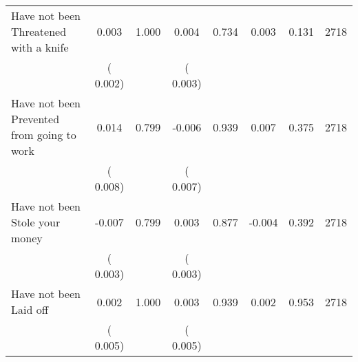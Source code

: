 \begin{tabular}{l*{7}{c}}
 Have not been Threatened with a knife       &              0.003       &        1.000  &              0.004       &        0.734  &              0.003       &              0.131 &  2718 \\ 
                       &       (       0.002)             &                               &       (       0.003)                     &                               &                                               &                                &                      \\ 

 Have not been Prevented from going to work       &              0.014       &        0.799  &             -0.006       &        0.939  &              0.007       &              0.375 &  2718 \\ 
                       &       (       0.008)             &                               &       (       0.007)                     &                               &                                               &                                &                      \\ 

 Have not been Stole your money       &             -0.007       &        0.799  &              0.003       &        0.877  &             -0.004       &              0.392 &  2718 \\ 
                       &       (       0.003)             &                               &       (       0.003)                     &                               &                                               &                                &                      \\ 

 Have not been Laid off       &              0.002       &        1.000  &              0.003       &        0.939  &              0.002       &              0.953 &  2718 \\ 
                       &       (       0.005)             &                               &       (       0.005)                     &                               &                                               &                                &                      \\ 

\hline \end{tabular}